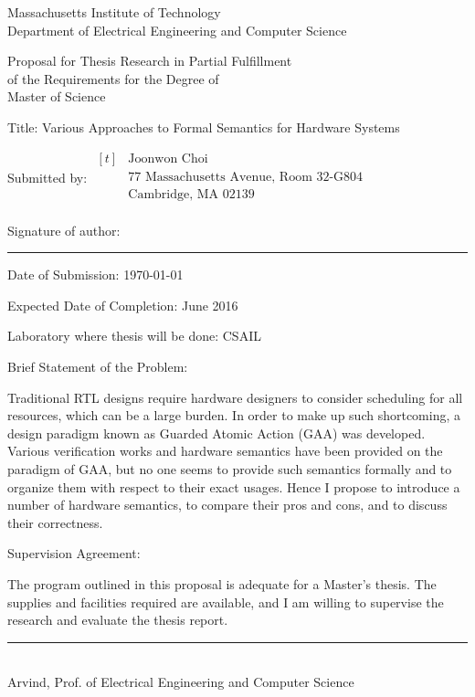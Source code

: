 
\begin{center}
  Massachusetts Institute of Technology\\
  Department of Electrical Engineering and Computer Science\dbsp

  Proposal for Thesis Research in Partial Fulfillment\\
  of the Requirements for the Degree of\\
  Master of Science\dbsp
\end{center}

{\parindent0pt

  Title: Various Approaches to Formal Semantics for Hardware Systems\dbsp

  Submitted by: $\begin{aligned}[t]
    &\textrm{Joonwon Choi}\\
    &\textrm{77 Massachusetts Avenue, Room 32-G804}\\
    &\textrm{Cambridge, MA 02139}\\
  \end{aligned}$\dbsp

  Signature of author: \rule{10cm}{0.4pt}\dbsp

  Date of Submission: \today\dbsp

  Expected Date of Completion: June 2016\dbsp

  Laboratory where thesis will be done: CSAIL\dbsp

  Brief Statement of the Problem:


  Traditional RTL designs require hardware designers to consider
  scheduling for all resources, which can be a large burden. In order
  to make up such shortcoming, a design paradigm known as Guarded
  Atomic Action (GAA) was developed. Various verification works and
  hardware semantics have been provided on the paradigm of GAA, but no
  one seems to provide such semantics formally and to organize them
  with respect to their exact usages. Hence I propose to introduce a
  number of hardware semantics, to compare their pros and cons, and to
  discuss their correctness.\dbsp

  Supervision Agreement:

  The program outlined in this proposal is adequate for a Master's
  thesis. The supplies and facilities required are available, and I am
  willing to supervise the research and evaluate the thesis
  report.\dbsp
}

\begin{flushright}
  \rule{10cm}{0.4pt}\\
  Arvind, Prof. of Electrical Engineering and Computer Science
\end{flushright}

\newpage
